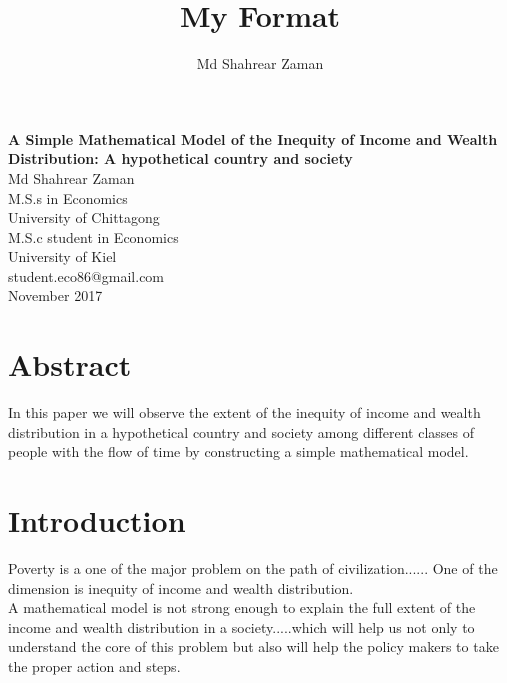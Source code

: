 \documentclass[12pt,a4paper]{article}
\author{Md Shahrear Zaman}
\title{My Format}
\begin{document}
	 \begin{center}
	 	{\textbf{\huge A Simple Mathematical Model of the Inequity of Income and Wealth Distribution: A hypothetical country and society }}	
	     \vspace{1.5cm}
	 	 \\ Md Shahrear Zaman
	 	 \bigskip
	 	 \\M.S.s in Economics
	 	 \\University of Chittagong
	 	 \\M.S.c student in Economics
	 	 \\University of Kiel
	 	 \medskip
	 	 \\student.eco86@gmail.com
	 	 \bigskip
	 	 \\November 2017
	 	 
	 	\end{center}
	\newpage
	\tableofcontents
	\newpage
	\section{Abstract}
In this paper we will observe the extent of the inequity of income and wealth distribution in a hypothetical country and society among different classes of people with the flow of time by constructing a simple mathematical model.		
		

	\section{Introduction}
Poverty is a one of the major problem on the path of civilization...... One of the dimension is inequity of income and wealth distribution. 
\medskip
\\A mathematical model is not strong enough to explain the full extent of the income and wealth distribution in a society.....which will help us not only to understand the core of this problem but also will help the policy makers to take the proper action and steps.                
                   
\end{document}
